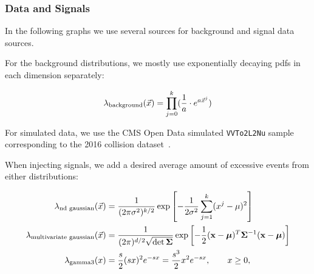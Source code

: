 \documentclass[../../ddppaper2.tex]{subfiles}
\begin{document}
\subsubsection{Data and Signals}

In the following graphs we use several sources for background and signal data sources.

For the background distributions, we mostly use exponentially decaying pdfs in each dimension separately:

\begin{equation}
    {{\lambda}_{\text{background}}(\vec{{x}})} = \prod\limits_{j=0}^k (\dfrac{1}{a} \cdot e^{a\vec{{x}}^j})
\end{equation}

For simulated data, we use the CMS Open Data simulated \texttt{VVTo2L2Nu} sample corresponding to the 2016 collision dataset~\cite{CMS_OpenData_VVTo2L2Nu_2016}.

When injecting signals, we add a desired average amount of excessive events from either distributions:

\begin{equation}
\begin{aligned}
    {{\lambda}_{\text{nd gaussian}}(\vec{{x}})}
    &=
    \frac{1}{(2\pi\sigma^2)^{k/2}}
    \exp\left[
        -\frac{1}{2\sigma^2}
        \sum_{j=1}^{k}(x^j-\mu)^2
    \right]
    \\
    {{\lambda}_{\text{multivariate gaussian}}(\vec{{x}})}
    &=
    \frac{1}
    {(2\pi)^{d/2}\sqrt{\det\boldsymbol{\Sigma}}}
    \exp\left[
        -\frac{1}{2}
        (\mathbf{x}-\boldsymbol{\mu})^{T}
        \boldsymbol{\Sigma}^{-1}
        (\mathbf{x}-\boldsymbol{\mu})
    \right]
    \\
    {\lambda}_{\text{gamma3}}({x})
    &=
    \frac{s}{2}
    (s {x})^2
    e^{-s {x}}
    =
    \frac{s^3}{2}{x}^2 e^{-s {x}},
    \qquad {x} \geq 0,
\end{aligned}
\end{equation}
\end{document}
